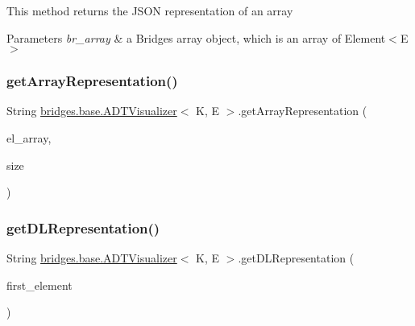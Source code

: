 This method returns the J\+S\+ON representation of an array


\begin{DoxyParams}{Parameters}
{\em br\+\_\+array} & a Bridges array object, which is an array of Element$<$\+E$>$ \\
\hline
\end{DoxyParams}
\hypertarget{classbridges_1_1base_1_1_a_d_t_visualizer_ad44bb58d6f9c630cc6bbcae175003243}{}\label{classbridges_1_1base_1_1_a_d_t_visualizer_ad44bb58d6f9c630cc6bbcae175003243} 
\subsubsection{\texorpdfstring{get\+Array\+Representation()}{getArrayRepresentation()}\hspace{0.1cm}{\footnotesize\ttfamily [2/2]}}
{\footnotesize\ttfamily String \hyperlink{classbridges_1_1base_1_1_a_d_t_visualizer}{bridges.\+base.\+A\+D\+T\+Visualizer}$<$ K, E $>$.get\+Array\+Representation (\begin{DoxyParamCaption}\item[{\hyperlink{classbridges_1_1base_1_1_element}{Element}$<$ E $>$ \mbox{[}$\,$\mbox{]}}]{el\+\_\+array,  }\item[{int}]{size }\end{DoxyParamCaption})}

\hypertarget{classbridges_1_1base_1_1_a_d_t_visualizer_a43eeb9f3321477f58edc3aff52631f3b}{}\label{classbridges_1_1base_1_1_a_d_t_visualizer_a43eeb9f3321477f58edc3aff52631f3b} 
\subsubsection{\texorpdfstring{get\+D\+L\+Representation()}{getDLRepresentation()}}
{\footnotesize\ttfamily String \hyperlink{classbridges_1_1base_1_1_a_d_t_visualizer}{bridges.\+base.\+A\+D\+T\+Visualizer}$<$ K, E $>$.get\+D\+L\+Representation (\begin{DoxyParamCaption}\item[{\hyperlink{classbridges_1_1base_1_1_d_lelement}{D\+Lelement}$<$ E $>$}]{first\+\_\+element }\end{DoxyParamCaption})}

